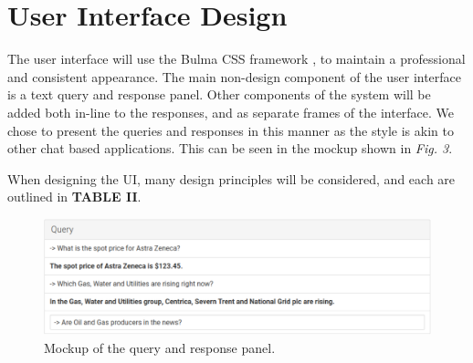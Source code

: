 \documentclass[]{IEEEtran}
\begin{document}
\section{User Interface Design}

The user interface will use the Bulma CSS framework \cite{bulma}, to maintain a professional and consistent appearance. The main non-design component of the user interface is a text query and response panel. Other components of the system will be added both in-line to the responses, and as separate frames of the interface. We chose to present the queries and responses in this manner as the style is akin to other chat based applications. This can be seen in the mockup shown in \textit{Fig. 3}. 

When designing the UI, many design principles will be considered, and each are outlined in \textbf{TABLE II}.
\begin{figure}[h]
	\includegraphics[scale=0.6]{ui}
	\caption{Mockup of the query and response panel.}
\end{figure}
\end{document}

